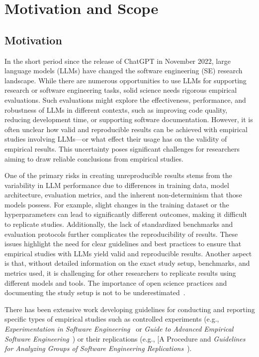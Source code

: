 



\section{Motivation and Scope}

\subsection{Motivation}

In the short period since the release of ChatGPT in November 2022, large language models (LLMs) have changed the software engineering (SE) research landscape.
While there are numerous opportunities to use LLMs for supporting research or software engineering tasks, solid science needs rigorous empirical evaluations.
Such evaluations might explore the effectiveness, performance, and robustness of LLMs in different contexts, such as improving code quality, reducing development time, or supporting software documentation.
However, it is often unclear how valid and reproducible results can be achieved with empirical studies involving LLMs---or what effect their usage has on the validity of empirical results.
This uncertainty poses significant challenges for researchers aiming to draw reliable conclusions from empirical studies.

One of the primary risks in creating unreproducible results stems from the variability in LLM performance due to differences in training data, model architecture, evaluation metrics, and the inherent non-determinism that those models possess.
For example, slight changes in the training dataset or the hyperparameters can lead to significantly different outcomes, making it difficult to replicate studies.
Additionally, the lack of standardized benchmarks and evaluation protocols further complicates the reproducibility of results.
These issues highlight the need for clear guidelines and best practices to ensure that empirical studies with LLMs yield valid and reproducible results.
Another aspect is that, without detailed information on the exact study setup, benchmarks, and metrics used, it is challenging for other researchers to replicate results using different models and tools.
The importance of open science practices and documenting the study setup is not to be underestimated~\cite{DBLP:journals/corr/abs-2412-17859}.

There has been extensive work developing guidelines for conducting and reporting specific types of empirical studies such as controlled experiments (e.g., \emph{Experimentation in Software Engineering}~\cite{DBLP:books/sp/WohlinRHORW24} or \emph{Guide to Advanced Empirical Software Engineering}~\cite{DBLP:books/sp/08/SSS2008}) or their replications (e.g., [A Procedure and \emph{Guidelines for Analyzing Groups of Software Engineering Replications}~\cite{DBLP:journals/tse/SantosVOJ21}).

